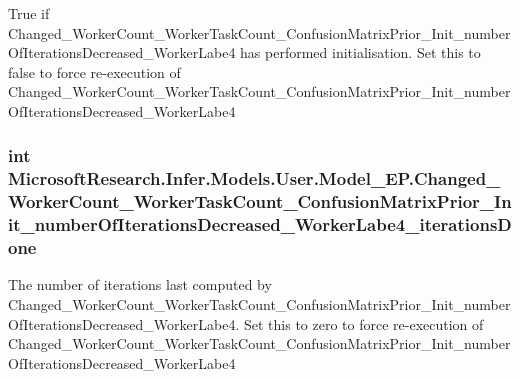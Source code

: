 True if Changed\+\_\+\+Worker\+Count\+\_\+\+Worker\+Task\+Count\+\_\+\+Confusion\+Matrix\+Prior\+\_\+\+Init\+\_\+number\+Of\+Iterations\+Decreased\+\_\+\+Worker\+Labe4 has performed initialisation. Set this to false to force re-\/execution of Changed\+\_\+\+Worker\+Count\+\_\+\+Worker\+Task\+Count\+\_\+\+Confusion\+Matrix\+Prior\+\_\+\+Init\+\_\+number\+Of\+Iterations\+Decreased\+\_\+\+Worker\+Labe4

\hypertarget{class_microsoft_research_1_1_infer_1_1_models_1_1_user_1_1_model___e_p_a5bf8aef1624310fee144a221a1108716}{}
\subsubsection[{Changed\+\_\+\+Worker\+Count\+\_\+\+Worker\+Task\+Count\+\_\+\+Confusion\+Matrix\+Prior\+\_\+\+Init\+\_\+number\+Of\+Iterations\+Decreased\+\_\+\+Worker\+Labe4\+\_\+iterations\+Done}]{\setlength{\rightskip}{0pt plus 5cm}int Microsoft\+Research.\+Infer.\+Models.\+User.\+Model\+\_\+\+E\+P.\+Changed\+\_\+\+Worker\+Count\+\_\+\+Worker\+Task\+Count\+\_\+\+Confusion\+Matrix\+Prior\+\_\+\+Init\+\_\+number\+Of\+Iterations\+Decreased\+\_\+\+Worker\+Labe4\+\_\+iterations\+Done}\label{class_microsoft_research_1_1_infer_1_1_models_1_1_user_1_1_model___e_p_a5bf8aef1624310fee144a221a1108716}


The number of iterations last computed by Changed\+\_\+\+Worker\+Count\+\_\+\+Worker\+Task\+Count\+\_\+\+Confusion\+Matrix\+Prior\+\_\+\+Init\+\_\+number\+Of\+Iterations\+Decreased\+\_\+\+Worker\+Labe4. Set this to zero to force re-\/execution of Changed\+\_\+\+Worker\+Count\+\_\+\+Worker\+Task\+Count\+\_\+\+Confusion\+Matrix\+Prior\+\_\+\+Init\+\_\+number\+Of\+Iterations\+Decreased\+\_\+\+Worker\+Labe4

